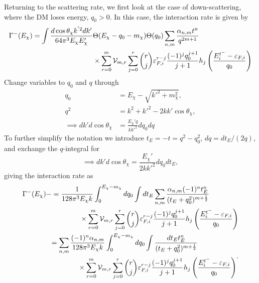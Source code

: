 Returning to the scattering rate, we first look at the case of down-scattering, where the DM loses energy, $q_0 > 0$. In this case, the interaction rate is given by
\begin{equation}
    \begin{split}
        \Gamma^{-}(E_\chi) = \int \frac{d\cos\theta_\chi k^{'2}dk'}{64\pi^3 E_\chi E'_\chi } & \Theta(E_\chi-q_0-m_\chi)\Theta(q_0)\sum_{n,m} \frac{\alpha_{n,m} t^n}{ q^{2m + 1}}\\
        &\times \sum_{r=0}^m \mathcal{V}_{m,r} \sum_{j = 0}^r \binom{r}{j} \varepsilon_{F,i}^{r-j}  \frac{(-1)^{j} q_0^{j+1}}{j+1} h_j\left( \frac{E_i^{t^-} - \varepsilon_{F,i}}{q_0}\right)
    \end{split}
\end{equation}
Change variables to $q_0$ and $q$ through
\begin{align}
    q_0 &= E_\chi - \sqrt{k'^2 +m_\chi^2},\\
    q^2 &= k^2 + k'^2 -2kk'\cos\theta_\chi,\\
    \implies dk' d\cos\theta_\chi  & = \frac{E_\chi' q}{kk'^2} dq_0 dq
\end{align}
To further simplify the notation we introduce $t_E = -t = q^2 - q_0^2$, $dq = dt_E/(2q)$, and exchange the $q$-integral for
\begin{equation}
    \implies dk' d\cos\theta_\chi = \frac{E_\chi' }{2kk'^2} dq_0 dt_E,
\end{equation}
giving the interaction rate as
\begin{align}
    \begin{split}
        \Gamma^{-}(E_\chi)- & = \frac{1}{128\pi^3 E_\chi k }\int_0^{E_\chi -m_\chi} dq_0 \int dt_E\sum_{n,m} \frac{\alpha_{n,m} (-1)^n t_E^n}{ (t_E+q_0^2)^{m + \frac{1}{2}}}\\
        &\hspace{4em}\times\sum_{r=0}^m \mathcal{V}_{m,r} \sum_{j = 0}^r \binom{r}{j} \varepsilon_{F,i}^{r-j}  \frac{(-1)^{j} q_0^{j+1}}{j+1} h_j\left( \frac{E_i^{t^-} - \varepsilon_{F,i}}{q_0}\right)
    \end{split}\\
    \begin{split}
        & = \sum_{n,m}  \frac{(-1)^n \alpha_{n,m}}{128\pi^3 E_\chi k }\int_0^{E_\chi -m_\chi} dq_0\int \frac{dt_E t_E^n}{(t_E + q_0^2)^{m+\frac{1}{2}}}\\
        &\hspace{4em}\times\sum_{r=0}^m \mathcal{V}_{m,r}\sum_{j = 0}^r\binom{r}{j} \varepsilon_{F,i}^{r-j}  \frac{(-1)^{j} q_0^{j+1}}{j+1} h_j\left( \frac{E_i^{t^-} - \varepsilon_{F,i}}{q_0}\right)
    \end{split}.
\end{align}


